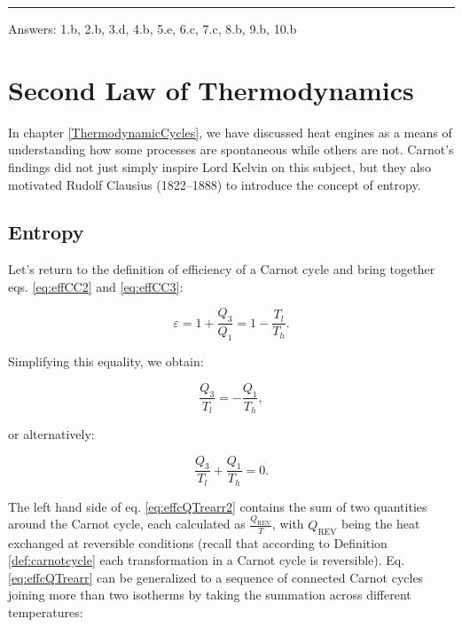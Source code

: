 \documentclass[
  9pt,
]{extbook}
\theoremstyle{definition}
\theoremstyle{definition}
\theoremstyle{definition}
\theoremstyle{remark}
\begin{document}
\begin{center}\rule{0.5\linewidth}{0.5pt}\end{center}

Answers: 1.b, 2.b, 3.d, 4.b, 5.e, 6.c, 7.c, 8.b, 9.b, 10.b

\hypertarget{SecondLaw}{%
\chapter{Second Law of Thermodynamics}\label{SecondLaw}}

In chapter \ref{ThermodynamicCycles}, we have discussed heat engines as a means of understanding how some processes are spontaneous while others are not. Carnot's findings did not just simply inspire Lord Kelvin on this subject, but they also motivated Rudolf Clausius (1822--1888) to introduce the concept of entropy.

\hypertarget{entropyint}{%
\section{Entropy}\label{entropyint}}

Let's return to the definition of efficiency of a Carnot cycle and bring together eqs. \eqref{eq:effCC2} and \eqref{eq:effCC3}:

\begin{equation}
\varepsilon = 1+\frac{Q_3}{Q_1} = 1-\frac{T_l}{T_h}.
\label{eq:effcQT}
\end{equation}

Simplifying this equality, we obtain:

\begin{equation}
\frac{Q_3}{T_l} = -\frac{Q_1}{T_h},
\label{eq:effcQTrearr}
\end{equation}

or alternatively:

\begin{equation}
\frac{Q_3}{T_l} + \frac{Q_1}{T_h} = 0.
\label{eq:effcQTrearr2}
\end{equation}

The left hand side of eq. \eqref{eq:effcQTrearr2} contains the sum of two quantities around the Carnot cycle, each calculated as \(\frac{Q_{\mathrm{REV}}}{T}\), with \(Q_{\mathrm{REV}}\) being the heat exchanged at reversible conditions (recall that according to Definition \ref{def:carnotcycle} each transformation in a Carnot cycle is reversible). Eq. \eqref{eq:effcQTrearr} can be generalized to a sequence of connected Carnot cycles joining more than two isotherms by taking the summation across different temperatures:
\end{document}
